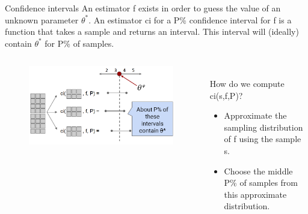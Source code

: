 \documentclass[aspectratio=169]{../latex_main/tntbeamer}  %
\begin{document}
	
	\begin{frame}{Confidence intervals}
	    An estimator f exists in order to guess the value of an unknown parameter $\theta^*$.
        An estimator ci for a P\% confidence interval for f is a function that takes a sample and returns an interval. This interval will (ideally) contain $\theta^*$ for P\% of samples.
        \begin{columns}
            \begin{column}{.5\textwidth}
                    \begin{figure}
                        \centering
                        \includegraphics[scale=.35]{Bild8}
                    \end{figure}
            \end{column}
        
        
             \begin{column}{.5\textwidth}
             \\
             \bigskip
             \bigskip
                How do we compute ci(s,f,P)?
                    \begin{itemize}
                        \item Approximate the sampling distribution of f using the sample s.
                        \item Choose the middle P\% of samples from this approximate distribution.
                    \end{itemize}
            \end{column}
        
        \end{columns}
        
	\end{frame}
	
	
	
\end{document}
